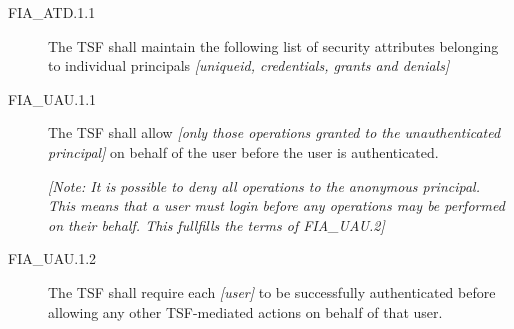 \documentclass[12pt,english]{scrbook}
\begin{document}



\begin{description}
\item[FIA{\_}ATD.1.1 ]

The TSF shall maintain the following list of security attributes
belonging to individual principals \emph{{[}uniqueid, credentials, grants
and denials]}

\end{description}





\begin{description}
\item[FIA{\_}UAU.1.1 ]

The TSF shall allow \emph{{[}only those operations granted to the
unauthenticated principal]} on behalf of the user before the user is
authenticated.

\emph{{[}Note: It is possible to deny all operations to the anonymous
principal. This means that a user must login before any operations may
be performed on their behalf. This fullfills the terms of FIA{\_}UAU.2]}

\item[FIA{\_}UAU.1.2 ]

The TSF shall require each \emph{{[}user]} to be successfully
authenticated before allowing any other TSF-mediated actions on behalf
of that user.

\end{description}


\end{document}

